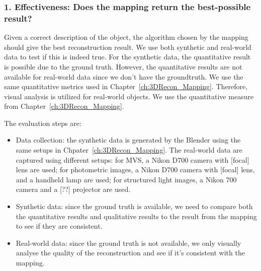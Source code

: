\subsubsection{1. Effectiveness: Does the mapping return the best-possible result?}
Given a correct description of the object, the algorithm chosen by the mapping should give the best reconstruction result. We use both synthetic and real-world data to test if this is indeed true. For the synthetic data, the quantitative result is possible due to the ground truth. However, the quantitative results are not available for real-world data since we don't have the groundtruth. We use the same quantitative metrics used in Chapter~\ref{ch:3DRecon_Mapping}. Therefore, visual analysis is utilized for real-world objects. We use the quantitative measure from Chapter~\ref{ch:3DRecon_Mapping}.

The evaluation steps are:
\begin{itemize}
\item Data collection: the synthetic data is generated by the Blender using the same setups in Chpater~\ref{ch:3DRecon_Mapping}. The real-world data are captured using different setups: for MVS, a Nikon D700 camera with [focal] lens are used; for photometric images, a Nikon D700 camera with [focal] lens, and a handheld lamp are used; for structured light images, a Nikon 700 camera and a [??] projector are used.
\item Synthetic data: since the ground truth is available, we need to compare both the quantitative results and qualitative results to the result from the mapping to see if they are consistent.
\item Real-world data: since the ground truth is not available, we only visually analyse the quality of the reconstruction and see if it's consistent with the mapping.
\end{itemize}


